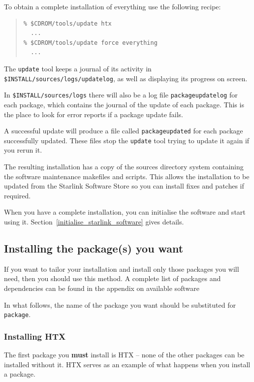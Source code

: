 \documentclass[twoside,11pt]{article}
\newcommand{\htmlref}[2]{#1}
\renewcommand{\_}{\texttt{\symbol{95}}}
\begin{document}
To obtain a complete installation of everything use the following
recipe:

\begin{quote}
\begin{verbatim}
% $CDROM/tools/update htx
  ...
% $CDROM/tools/update force everything
  ...
\end{verbatim}
\end{quote}

The \texttt{update} tool keeps a journal of its activity in
\texttt{\$INSTALL/sources/logs/update\_log}, as well as
displaying its progress on screen.

In \texttt{\$INSTALL/sources/logs} there will also be a log file
\texttt{package\_update\_log} for each package, which contains the
journal of the update of each package.  This is the place to look for
error reports if a package update fails.

A successful update will produce a file called \texttt{package\_updated}
for each package successfully updated.  These files stop the
\texttt{update} tool trying to update it again if you rerun it.

The resulting installation has a copy of the sources directory system
containing the software maintenance makefiles and scripts.  This allows
the installation to be updated from the Starlink Software Store so you can
install fixes and patches if required.

When you have a complete installation, you can initialise the software
and start using it.  Section~\ref{initialise_starlink_software} gives details.

\subsection{Installing the package(s) you want}

If you want to tailor your installation and install only those packages
you will need, then you should use this method.  A complete list of
packages and dependencies can be found in the appendix on
\htmlref{available software}{available_software}

In what follows, the name of the package you want should be substituted
for \texttt{package}.

\subsubsection{Installing HTX}

The first package you \textbf{must} install is HTX -- none of the other
packages can be installed without it.  HTX serves as an example of what
happens when you install a package.
\end{document}
